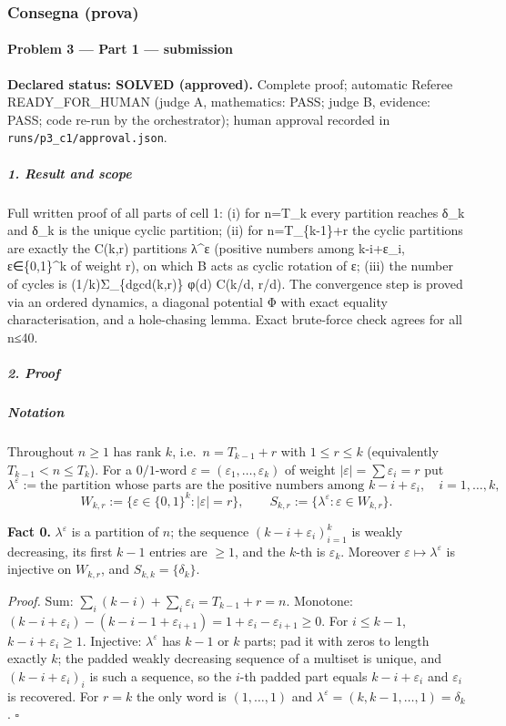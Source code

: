 \documentclass[11pt,a4paper]{article}
\begin{document}
\subsubsection{Consegna (prova)}
\paragraph{Problem 3 --- Part 1 ---
submission}\label{problem-3-part-1-submission}

\textbf{Declared status: SOLVED (approved).} Complete proof; automatic
Referee READY\_FOR\_HUMAN (judge A, mathematics: PASS; judge B,
evidence: PASS; code re-run by the orchestrator); human approval
recorded in \texttt{runs/p3\_c1/approval.json}.

\subparagraph{1. Result and scope}\label{result-and-scope}

Full written proof of all parts of cell 1: (i) for n=T\_k every
partition reaches δ\_k and δ\_k is the unique cyclic partition; (ii) for
n=T\_\{k-1\}+r the cyclic partitions are exactly the C(k,r) partitions
λ\^{}ε (positive numbers among k-i+ε\_i, ε∈\{0,1\}\^{}k of weight r), on
which B acts as cyclic rotation of ε; (iii) the number of cycles is
(1/k)Σ\_\{d\textbar gcd(k,r)\} φ(d) C(k/d, r/d). The convergence step is
proved via an ordered dynamics, a diagonal potential Φ with exact
equality characterisation, and a hole-chasing lemma. Exact brute-force
check agrees for all n≤40.

\subparagraph{2. Proof}\label{proof}

\subparagraph{Notation}\label{notation}

Throughout \(n\ge 1\) has rank \(k\), i.e.~\(n=T_{k-1}+r\) with
\(1\le r\le k\) (equivalently \(T_{k-1}<n\le T_k\)). For a \(0/1\)-word
\(\varepsilon=(\varepsilon_1,\dots,\varepsilon_k)\) of weight
\(|\varepsilon|=\sum\varepsilon_i=r\) put
\[\lambda^{\varepsilon}:=\text{the partition whose parts are the positive numbers among } k-i+\varepsilon_i,\quad i=1,\dots,k,\]
\[W_{k,r}:=\{\varepsilon\in\{0,1\}^k:|\varepsilon|=r\},\qquad S_{k,r}:=\{\lambda^{\varepsilon}:\varepsilon\in W_{k,r}\}.\]

\textbf{Fact 0.} \(\lambda^\varepsilon\) is a partition of \(n\); the
sequence \((k-i+\varepsilon_i)_{i=1}^k\) is weakly decreasing, its first
\(k-1\) entries are \(\ge1\), and the \(k\)-th is \(\varepsilon_k\).
Moreover \(\varepsilon\mapsto\lambda^\varepsilon\) is injective on
\(W_{k,r}\), and \(S_{k,k}=\{\delta_k\}\).

\emph{Proof.} Sum: \(\sum_i(k-i)+\sum_i\varepsilon_i=T_{k-1}+r=n\).
Monotone:
\((k-i+\varepsilon_i)-(k-i-1+\varepsilon_{i+1})=1+\varepsilon_i-\varepsilon_{i+1}\ge0\).
For \(i\le k-1\), \(k-i+\varepsilon_i\ge1\). Injective:
\(\lambda^\varepsilon\) has \(k-1\) or \(k\) parts; pad it with zeros to
length exactly \(k\); the padded weakly decreasing sequence of a
multiset is unique, and \((k-i+\varepsilon_i)_i\) is such a sequence, so
the \(i\)-th padded part equals \(k-i+\varepsilon_i\) and
\(\varepsilon_i\) is recovered. For \(r=k\) the only word is
\((1,\dots,1)\) and \(\lambda^\varepsilon=(k,k-1,\dots,1)=\delta_k\).
\(\square\)
\end{document}
